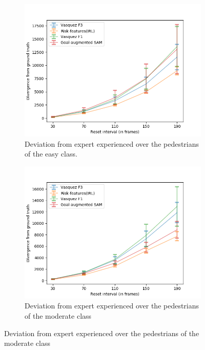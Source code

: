 \begin{figure}[htbp]
	\begin{subfigure}{0.5\textwidth}
		\centering
		\includegraphics[width=\linewidth]{plots/plot_without_outliers/zara02_inter_irl_no_outlier/Zara02_irl_easy.png}
		\caption {Deviation from expert experienced over the pedestrians of the easy class.}
		\label{fig:inter_IRL-drift_analysis_easy-zara02}
	\end{subfigure}
	\begin{subfigure}{0.5\textwidth}
		\centering
     	\includegraphics[width=\linewidth]{plots/plot_without_outliers/zara02_inter_irl_no_outlier/Zara02_irl_med.png}
		\caption {Deviation from expert experienced over the pedestrians of the moderate class}

\end{subfigure}
\end{figure}
